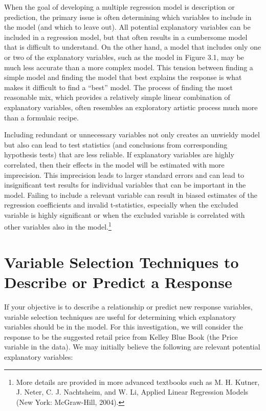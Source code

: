 \documentclass[
]{report}
\theoremstyle{definition}
\theoremstyle{definition}
\theoremstyle{definition}
\theoremstyle{definition}
\theoremstyle{remark}
\begin{document}
When the goal of developing a multiple regression model is description or prediction, the primary issue is often determining which variables to include in the model (and which to leave out). All potential explanatory variables can be included in a regression model, but that often results in a cumbersome model that is difficult to understand. On the other hand, a model that includes only one or two of the explanatory variables, such as the model in Figure 3.1, may be much less accurate than a more complex model. This tension between finding a simple model and finding the model that best explains the response is what makes it difficult to find a ``best'' model. The process of finding the most reasonable mix, which provides a relatively simple linear combination of explanatory variables, often resembles an exploratory artistic process much more than a formulaic recipe.

Including redundant or unnecessary variables not only creates an unwieldy model but also can lead to test statistics (and conclusions from corresponding hypothesis tests) that are less reliable. If explanatory variables are highly correlated, then their effects in the model will be estimated with more imprecision. This imprecision leads to larger standard errors and can lead to insignificant test results for individual variables that can be important in the model. Failing to include a relevant variable can result in biased estimates of the regression coefficients and invalid t-statistics, especially when the excluded variable is highly significant or when the excluded variable is correlated with other variables also in the model.\footnote{More details are provided in more advanced textbooks such as M. H. Kutner, J. Neter, C. J. Nachtsheim, and W. Li, Applied Linear Regression Models (New York: McGraw-Hill, 2004).}

\hypertarget{variable-selection-techniques-to-describe-or-predict-a-response}{%
\section{Variable Selection Techniques to Describe or Predict a Response}\label{variable-selection-techniques-to-describe-or-predict-a-response}}

If your objective is to describe a relationship or predict new response variables, variable selection techniques are useful for determining which explanatory variables should be in the model. For this investigation, we will consider the response to be the suggested retail price from Kelley Blue Book (the Price variable in the data). We may initially believe the following are relevant potential explanatory variables:
\end{document}
